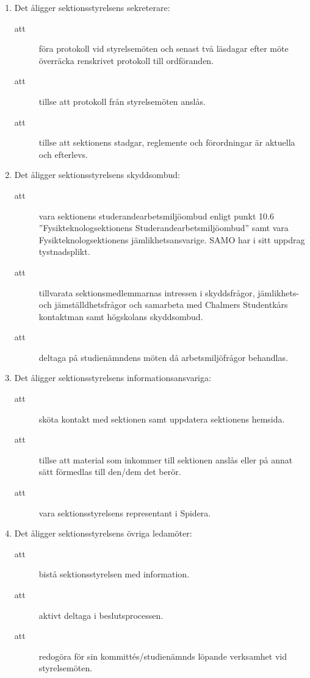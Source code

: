 \documentclass[11pt,a4paper]{article}
\begin{document}
\begin{enumerate}[\thesubsection .1]
  \item Det åligger sektionsstyrelsens sekreterare:
    \begin{description}
      \item[att] föra protokoll vid styrelsemöten och senast två läsdagar efter möte överräcka renskrivet protokoll till ordföranden.
      \item[att] tillse att protokoll från  styrelsemöten anslås.
      \item[att] tillse att sektionens stadgar, reglemente och förordningar är aktuella och efterlevs.
    \end{description}

  \item Det åligger sektionsstyrelsens skyddsombud:
    \begin{description}
      \item[att] vara sektionens studerandearbetsmiljöombud
      enligt punkt 10.6 ''Fysikteknologsektionens Studerandearbetsmiljöombud'' samt vara Fys\-ik\-teknolog\-sektionens jämlikhetsansvarige. SAMO har i sitt uppdrag tystnadsplikt.
      \item[att] tillvarata sektionsmedlemmarnas intressen i skyddsfrågor, jämlikhets- och jämställdhetsfrågor och samarbeta med Chalmers Studentkårs kontaktman samt högskolans skyddsombud.
      \item[att] deltaga på studienämndens möten då arbetsmiljöfrågor behandlas.
    \end{description}
    
  \item Det åligger sektionsstyrelsens informationsansvariga:  
    \begin{description}
      \item[att] sköta kontakt med sektionen samt uppdatera sektionens hemsida. 
      \item[att] tillse att material som inkommer till sektionen anslås eller på annat sätt förmedlas  till den/dem det berör.
      \item[att] vara sektionsstyrelsens representant i Spidera.
    \end{description}    

  \item Det åligger sektionsstyrelsens  övriga ledamöter:
    \begin{description}
      \item[att] bistå sektionsstyrelsen med information.
      \item[att] aktivt deltaga i beslutsprocessen.
      \item[att] redogöra för sin kommittés/studienämnds löpande verksamhet vid styrel\-se\-möten.
      
    \end{description}
\end{enumerate}
\end{document}
